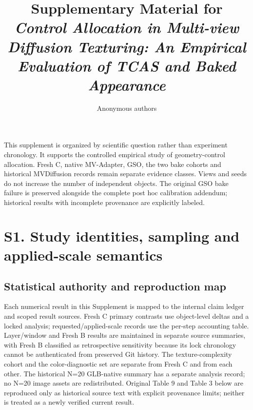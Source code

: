 \documentclass[11pt]{article}
\title{Supplementary Material for\\
\emph{Control Allocation in Multi-view Diffusion Texturing: An Empirical Evaluation of TCAS and Baked Appearance}}
\author{Anonymous authors}
\date{}
\begin{document}
\maketitle
\noindent This supplement is organized by scientific question rather than experiment chronology. It supports the controlled empirical study of geometry-control allocation. Fresh C, native MV-Adapter, GSO, the two bake cohorts and historical MVDiffusion records remain separate evidence classes. Views and seeds do not increase the number of independent objects. The original GSO bake failure is preserved alongside the complete post hoc calibration addendum; historical results with incomplete provenance are explicitly labeled.

\tableofcontents
\clearpage
\FloatBarrier
\section*{S1. Study identities, sampling and applied-scale semantics}
\label{supp:group1}

\subsection*{Statistical authority and reproduction map}
Each numerical result in this Supplement is mapped to the internal claim ledger and scoped result sources. Fresh C primary contrasts use object-level deltas and a locked analysis; requested/applied-scale records use the per-step accounting table. Layer/window and Fresh B results are maintained in separate source summaries, with Fresh B classified as retrospective sensitivity because its lock chronology cannot be authenticated from preserved Git history. The texture-complexity cohort and the color-diagnostic set are separate from Fresh C and from each other. The historical N=20 GLB-native summary has a separate analysis record; no N=20 image assets are redistributed. Original Table 9 and Table 3 below are reproduced only as historical source text with explicit provenance limits; neither is treated as a newly verified current result.
\end{document}
